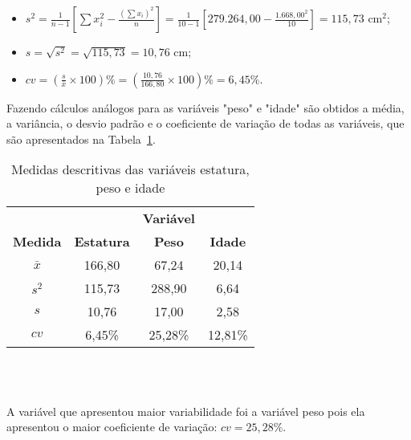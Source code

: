 \documentclass[11pt,fleqn]{book} %
\begin{document}
\begin{example}
\begin{itemize}
\item $\displaystyle s^2=\frac{1}{n-1}\left[\sum{x_i^2}-\frac{(\sum x_i)^2}{n}\right]
=\frac{1}{10-1}\left[279.264,00-\frac{1.668,00^2}{10}\right] = 115,73$ cm$^2$; \\

\item $\displaystyle s=\sqrt{s^2}=\sqrt{115,73}=10,76$ cm; \\

\item $\displaystyle cv=\left(\frac{s}{\bar{x}} \times 100\right)\% 
= \left(\frac{10,76}{166,80} \times 100\right)\% = 6,45 \%$. \\
\end{itemize}

\vspace{0,3cm}




Fazendo cálculos análogos para as variáveis "peso" e "idade" são obtidos a média, a variância, o desvio padrão e o coeficiente de variação de todas as variáveis, que são apresentados na Tabela~\ref{tab:coefvarmedidas}. \\

\begin{table}[h]
	\caption{Medidas descritivas das variáveis estatura, peso e idade}
	\label{tab:coefvarmedidas} 
	\vspace{-0.1cm}
	\centering
	\begin{tabular}{c | c c c}
	\toprule
	 & & \textbf{Variável} &  \\
	 \cmidrule(lr){2-4}
	\textbf{Medida} & \textbf{Estatura} & \textbf{Peso} & \textbf{Idade} \\
	\midrule
	$\bar{x}$ & 166,80 & 67,24 & 20,14 \\
	$s^2$ & 115,73 & 288,90 & 6,64 \\
	$s$ & 10,76 & 17,00 & 2,58 \\
	$cv$ & 6,45\% & 25,28\% & 12,81\% \\	
	\bottomrule
	\end{tabular} \\
\end{table}

\vspace{0,3cm}
 \\

A variável que apresentou maior variabilidade foi a variável peso pois ela apresentou o maior coeficiente de variação: $cv=25,28\%$. \\


\end{example}
\end{document}
